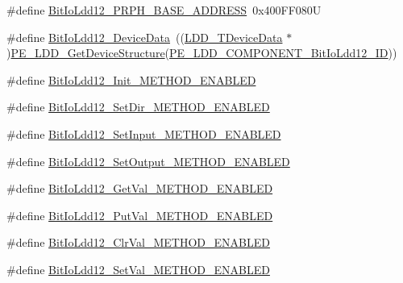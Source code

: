 \begin{DoxyCompactItemize}
\item 
\#define \hyperlink{group___bit_io_ldd12__module_gafc84dd93ada12ffaddc6cc06b73ad4b3}{Bit\+Io\+Ldd12\+\_\+\+P\+R\+P\+H\+\_\+\+B\+A\+S\+E\+\_\+\+A\+D\+D\+R\+E\+SS}~0x400\+F\+F080U
\item 
\#define \hyperlink{group___bit_io_ldd12__module_ga7332a1a453879ccef57a59ed20d8fee5}{Bit\+Io\+Ldd12\+\_\+\+Device\+Data}~((\hyperlink{group___p_e___types__module_gac5cf1362f1f0e3a2ce71b1bf2276d091}{L\+D\+D\+\_\+\+T\+Device\+Data} $\ast$)\hyperlink{group___p_e___types__module_gaa1c23d559daef5bcd3327ca83fb56f5a}{P\+E\+\_\+\+L\+D\+D\+\_\+\+Get\+Device\+Structure}(\hyperlink{group___p_e___types__module_ga684cd2cf91703cafad2f233a5cd8bb67}{P\+E\+\_\+\+L\+D\+D\+\_\+\+C\+O\+M\+P\+O\+N\+E\+N\+T\+\_\+\+Bit\+Io\+Ldd12\+\_\+\+ID}))
\item 
\#define \hyperlink{group___bit_io_ldd12__module_gae6c27383ad5362778c04e6aecd40fc70}{Bit\+Io\+Ldd12\+\_\+\+Init\+\_\+\+M\+E\+T\+H\+O\+D\+\_\+\+E\+N\+A\+B\+L\+ED}
\item 
\#define \hyperlink{group___bit_io_ldd12__module_ga7f6fc5e3fc6b86ec753652883e78ce75}{Bit\+Io\+Ldd12\+\_\+\+Set\+Dir\+\_\+\+M\+E\+T\+H\+O\+D\+\_\+\+E\+N\+A\+B\+L\+ED}
\item 
\#define \hyperlink{group___bit_io_ldd12__module_gaf8538faeefa861177760874be57d0232}{Bit\+Io\+Ldd12\+\_\+\+Set\+Input\+\_\+\+M\+E\+T\+H\+O\+D\+\_\+\+E\+N\+A\+B\+L\+ED}
\item 
\#define \hyperlink{group___bit_io_ldd12__module_gad4c95c9a3ea0ac3bcdbe81ac86b090a5}{Bit\+Io\+Ldd12\+\_\+\+Set\+Output\+\_\+\+M\+E\+T\+H\+O\+D\+\_\+\+E\+N\+A\+B\+L\+ED}
\item 
\#define \hyperlink{group___bit_io_ldd12__module_ga23de04ad97c041655874315db9a72e5d}{Bit\+Io\+Ldd12\+\_\+\+Get\+Val\+\_\+\+M\+E\+T\+H\+O\+D\+\_\+\+E\+N\+A\+B\+L\+ED}
\item 
\#define \hyperlink{group___bit_io_ldd12__module_ga512f07f24fff455b43372f4b05f6146a}{Bit\+Io\+Ldd12\+\_\+\+Put\+Val\+\_\+\+M\+E\+T\+H\+O\+D\+\_\+\+E\+N\+A\+B\+L\+ED}
\item 
\#define \hyperlink{group___bit_io_ldd12__module_ga0a4a7aeecfe45d8cf4d4a61b44747fda}{Bit\+Io\+Ldd12\+\_\+\+Clr\+Val\+\_\+\+M\+E\+T\+H\+O\+D\+\_\+\+E\+N\+A\+B\+L\+ED}
\item 
\#define \hyperlink{group___bit_io_ldd12__module_gab88f37f9852842ee8bd32bc9f7c44946}{Bit\+Io\+Ldd12\+\_\+\+Set\+Val\+\_\+\+M\+E\+T\+H\+O\+D\+\_\+\+E\+N\+A\+B\+L\+ED}
\item 

\end{DoxyCompactItemize}
